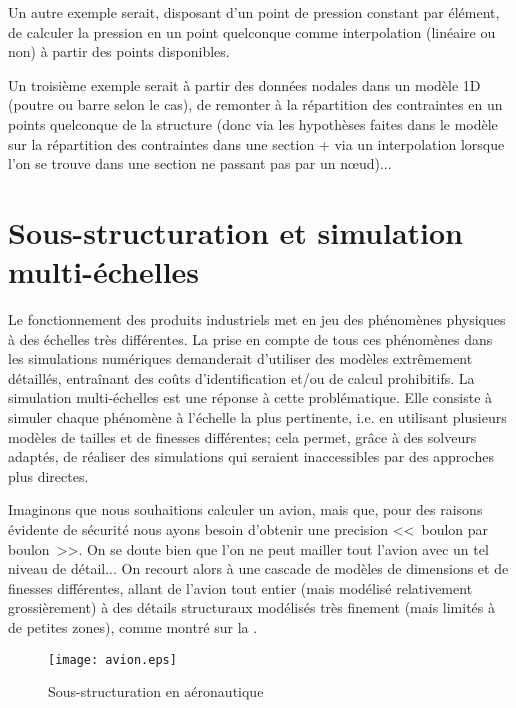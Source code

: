 \medskip
Un autre exemple serait, disposant d'un point de pression constant par élément, de
calculer la pression en un point quelconque comme interpolation (linéaire ou non) à
partir des points disponibles.

\medskip
Un troisième exemple serait à partir des données nodales dans un modèle 1D
(poutre ou barre selon le cas), de remonter à la répartition des contraintes en un
points quelconque de la structure (donc via les hypothèses faites dans le modèle
sur la répartition des contraintes dans une section + via un interpolation lorsque l'on se
trouve dans une section ne passant pas par un nœud)...

\ifVersionAvecExemplesSepares\else
\fi






\medskip
\section{Sous-structuration et simulation multi-échelles}\label{Sec-ssstruc}

Le fonctionnement des produits industriels met en jeu des phénomènes physiques à des
échelles très différentes.
La prise en compte de tous ces phénomènes dans les simulations numériques demanderait
d'utiliser des modèles extrêmement détaillés, entraînant des coûts d'identification
et/ou de calcul prohibitifs.
La simulation multi-échelles est une réponse à cette problématique.
Elle consiste à simuler chaque phénomène à l'échelle la plus pertinente,
i.e. en utilisant plusieurs modèles de tailles et de finesses différentes; cela permet,
grâce à des solveurs adaptés, de réaliser des simulations qui seraient inaccessibles
par des approches plus directes.

\medskip
Imaginons que nous souhaitions calculer un avion, mais que, pour des raisons
évidente de sécurité nous ayons besoin d'obtenir une precision <<~boulon par boulon~>>.
On se doute bien que l'on ne peut mailler tout l'avion avec un tel niveau de détail...
On recourt alors à une cascade de modèles de dimensions et de finesses différentes,
allant de l'avion tout entier (mais modélisé relativement grossièrement) à
des détails structuraux modélisés très finement (mais limités à de petites zones), comme
montré sur la .
\begin{figure}[ht]
\centering\texttt{[image: avion.eps]}
\caption{Sous-structuration en aéronautique}\label{Fig-avion}
\end{figure}

